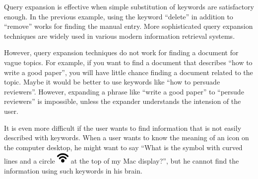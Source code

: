 \documentclass[manuscript,anonymous,review]{acmart}
\begin{document}
Query expansion is effective when simple substitution of keywords are satisfactory enough.
In the previous example, using the keyword ``delete'' in addition to ``remove'' works
for finding the manual entry.
More sophisticated query expansion techniques are widely used in various modern
information retrieval systems.

However, query expansion techniques do not work for finding a document for vague topics.
For example, if you want to find a document that describes ``how to write a good paper'',
you will have little chance finding a document related to the topic.
Maybe it would be better to use keywords like ``how to persuade reviewers''.
However, expanding a phrase like ``write a good paper'' to ``persude reviewers'' is impossible,
unless the expander understands the intension of the user.





It is even more difficult if the user wants to find information that is not easily described with keywords.
When a user wants to know the meaning of an icon on the computer desktop, he might want to say
``What is the symbol with curved lines and a circle
\includegraphics[width=6mm,bb=-40 30 225 225]{figures/fb2349ca17df1876178857566e7c68ef.png} %
at the top of my Mac display?'',
but he cannot find the information using such keywords in his brain.
\end{document}
